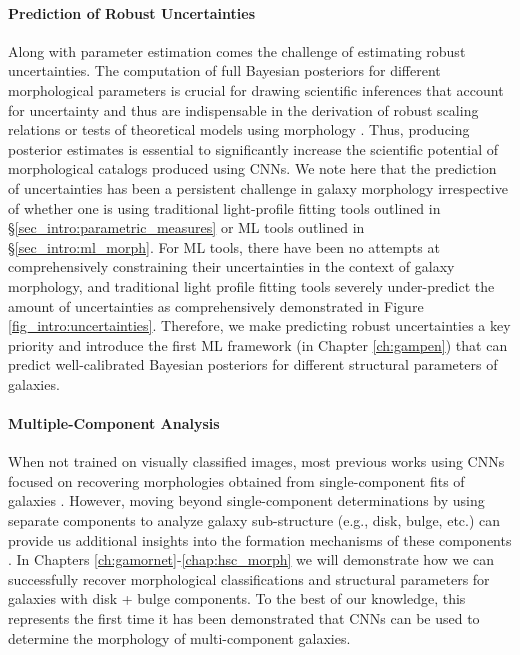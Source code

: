\paragraph{Prediction of Robust Uncertainties} Along with parameter estimation comes the challenge of estimating robust uncertainties. The computation of full Bayesian posteriors for different morphological parameters is crucial for drawing scientific inferences that account for uncertainty and thus are indispensable in the derivation of robust scaling relations  \citep[e.g.,][]{Bernardi2013TheProfile, vanderWel20143D-HST+CANDELS:3} or tests of theoretical models using morphology \citep[e.g.,][]{Schawinski2014TheGalaxies}. Thus, producing posterior estimates is essential to significantly increase the scientific potential of morphological catalogs produced using CNNs. We note here that the prediction of uncertainties has been a persistent challenge in galaxy morphology irrespective of whether one is using traditional light-profile fitting tools outlined in \S \ref{sec_intro:parametric_measures} or ML tools outlined in \S \ref{sec_intro:ml_morph}. For ML tools, there have been no attempts at comprehensively constraining their uncertainties in the context of galaxy morphology, and traditional light profile fitting tools severely under-predict the amount of uncertainties as comprehensively demonstrated in Figure \ref{fig_intro:uncertainties}. Therefore, we make predicting robust uncertainties a key priority and introduce the first ML framework (in Chapter \ref{ch:gampen}) that can predict well-calibrated Bayesian posteriors for different structural parameters of galaxies. 

\paragraph{Multiple-Component Analysis} When not trained on visually classified images, most previous works using CNNs focused on recovering morphologies obtained from single-component \sersic{} fits of galaxies \citep[e.g.,][]{Tuccillo2018DeepFitting}. However, moving beyond single-component determinations by using separate components to analyze galaxy sub-structure (e.g., disk, bulge, etc.) can provide us additional insights into the formation mechanisms of these components \citep[e.g.,][]{kormendy_1979,kormendy_2004, genzel_2008, sellwood_2014}. In Chapters \ref{ch:gamornet}-\ref{chap:hsc_morph} we will demonstrate how we can successfully recover morphological classifications and structural parameters for galaxies with disk + bulge components. To the best of our knowledge, this represents the first time it has been demonstrated that CNNs can be used to determine the morphology of multi-component galaxies.

